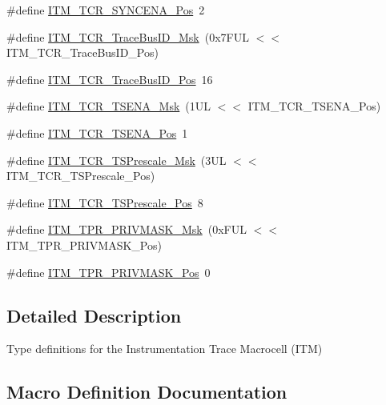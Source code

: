 \begin{DoxyCompactItemize}
\item 
\#define \hyperlink{group__CMSIS__ITM_gaa93a1147a39fc63980d299231252a30e}{I\+T\+M\+\_\+\+T\+C\+R\+\_\+\+S\+Y\+N\+C\+E\+N\+A\+\_\+\+Pos}~2
\item 
\#define \hyperlink{group__CMSIS__ITM_ga60c20bd9649d1da5a2be8e656ba19a60}{I\+T\+M\+\_\+\+T\+C\+R\+\_\+\+Trace\+Bus\+I\+D\+\_\+\+Msk}~(0x7\+F\+U\+L $<$$<$ I\+T\+M\+\_\+\+T\+C\+R\+\_\+\+Trace\+Bus\+I\+D\+\_\+\+Pos)
\item 
\#define \hyperlink{group__CMSIS__ITM_gaca0281de867f33114aac0636f7ce65d3}{I\+T\+M\+\_\+\+T\+C\+R\+\_\+\+Trace\+Bus\+I\+D\+\_\+\+Pos}~16
\item 
\#define \hyperlink{group__CMSIS__ITM_ga436b2e8fa24328f48f2da31c00fc9e65}{I\+T\+M\+\_\+\+T\+C\+R\+\_\+\+T\+S\+E\+N\+A\+\_\+\+Msk}~(1\+U\+L $<$$<$ I\+T\+M\+\_\+\+T\+C\+R\+\_\+\+T\+S\+E\+N\+A\+\_\+\+Pos)
\item 
\#define \hyperlink{group__CMSIS__ITM_ga5aa381845f810114ab519b90753922a1}{I\+T\+M\+\_\+\+T\+C\+R\+\_\+\+T\+S\+E\+N\+A\+\_\+\+Pos}~1
\item 
\#define \hyperlink{group__CMSIS__ITM_ga7a723f71bfb0204c264d8dbe8cc7ae52}{I\+T\+M\+\_\+\+T\+C\+R\+\_\+\+T\+S\+Prescale\+\_\+\+Msk}~(3\+U\+L $<$$<$ I\+T\+M\+\_\+\+T\+C\+R\+\_\+\+T\+S\+Prescale\+\_\+\+Pos)
\item 
\#define \hyperlink{group__CMSIS__ITM_gad7bc9ee1732032c6e0de035f0978e473}{I\+T\+M\+\_\+\+T\+C\+R\+\_\+\+T\+S\+Prescale\+\_\+\+Pos}~8
\item 
\#define \hyperlink{group__CMSIS__ITM_ga168e089d882df325a387aab3a802a46b}{I\+T\+M\+\_\+\+T\+P\+R\+\_\+\+P\+R\+I\+V\+M\+A\+S\+K\+\_\+\+Msk}~(0x\+F\+U\+L $<$$<$ I\+T\+M\+\_\+\+T\+P\+R\+\_\+\+P\+R\+I\+V\+M\+A\+S\+K\+\_\+\+Pos)
\item 
\#define \hyperlink{group__CMSIS__ITM_ga7abe5e590d1611599df87a1884a352e8}{I\+T\+M\+\_\+\+T\+P\+R\+\_\+\+P\+R\+I\+V\+M\+A\+S\+K\+\_\+\+Pos}~0
\end{DoxyCompactItemize}


\subsection{Detailed Description}
Type definitions for the Instrumentation Trace Macrocell (I\+TM) 



\subsection{Macro Definition Documentation}
